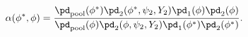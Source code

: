 \begin{equation}
  \alpha(\phi^{*}, \phi) = \frac {
    \pd_{\text{pool}}(\phi^{*})
    \pd_{2}(\phi^{*}, \psi_{2}, Y_{2})
    \pd_{1}(\phi)
    \pd_{2}(\phi)
  } {
    \pd_{\text{pool}}(\phi)
    \pd_{2}(\phi, \psi_{2}, Y_{2})
    \pd_{1}(\phi^{*})
    \pd_{2}(\phi^{*})
  }.
  \label{eqn:icu-stage-two-acceptance-probability}
\end{equation}